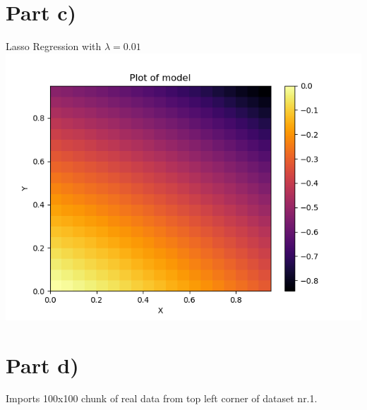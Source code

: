 \documentclass[a4paper,norsk]{article}
\begin{document}
\section*{Part c)}
Lasso Regression with $\lambda = 0.01$
\\ \includegraphics[scale=.7]{partcLassoLambda001}
\clearpage

\section*{Part d)}
Imports 100x100 chunk of real data from top left corner of dataset nr.1.
\clearpage
\end{document}
